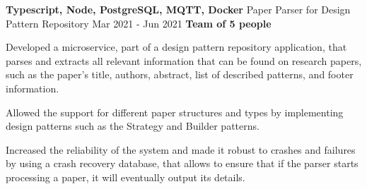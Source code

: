 \cventry
  {\textbf{Typescript, Node, PostgreSQL, MQTT, Docker}}
  {Paper Parser for Design Pattern Repository \href{https://github.com/EduRibeiro00/PatternParser-feup-asso}{\faExternalLink}} %
  {Mar 2021 - Jun 2021}
  {\textbf{Team of 5 people}}
  {
    \begin{cvitems} %
      \item {Developed a microservice, part of a design pattern repository application, that parses and extracts all relevant information that can be found on research papers, such as the paper's title, authors, abstract, list of described patterns, and footer information.}
      \item {Allowed the support for different paper structures and types by implementing design patterns such as the Strategy and Builder patterns.}
      \item {Increased the reliability of the system and made it robust to crashes and failures by using a crash recovery database, that allows to ensure that if the parser starts processing a paper, it will eventually output its details.}
    \end{cvitems}
  }